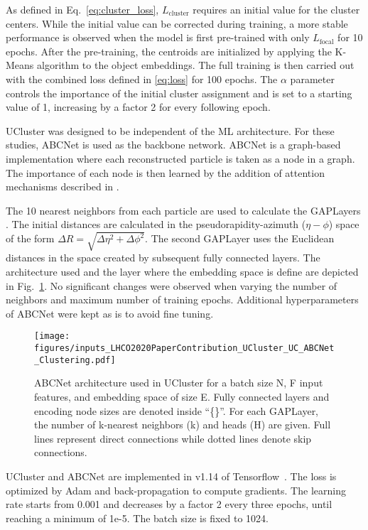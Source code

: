 \documentclass[a4paper,11pt]{article}
\begin{document}
As defined in Eq.~\ref{eq:cluster_loss}, $L_{\mathrm{cluster}}$ requires an initial value for the cluster centers. While the initial value can be corrected during training, a more stable performance is observed when the model is first pre-trained with only $L_{\mathrm{focal}}$ for 10 epochs. After the pre-training, the centroids are initialized by applying the K-Means algorithm \cite{10.2307/2346830} to the object embeddings. The full training is then carried out with the combined loss defined in \ref{eq:loss} for 100 epochs. The $\alpha$ parameter controls the importance of the initial cluster assignment and is set to a starting value of 1,  increasing by a factor 2 for every following epoch. 

UCluster was designed to be independent of the ML architecture. For these studies,  ABCNet \cite{Mikuni:2020wpr} is used as the backbone network. ABCNet is a graph-based implementation where each reconstructed particle is taken as a node in a graph. The importance of each node is then learned by the addition of attention mechanisms described in  \cite{velikovi2017graph}.

The 10 nearest neighbors from each particle are used to calculate the GAPLayers \cite{2019arXiv190508705C}. The initial distances are calculated in the pseudorapidity-azimuth ($\eta-\phi$) space of the form $\Delta R = \sqrt{\Delta\eta^2 + \Delta\phi^2}$. The second GAPLayer uses the Euclidean distances in the space created by subsequent fully connected layers. The architecture used and the layer where the embedding space is define are depicted in Fig.~\ref{fig:abc_model}. No significant changes were observed when varying the number of neighbors and maximum number of training epochs. Additional hyperparameters of ABCNet were kept as is to avoid fine tuning. 

\begin{figure}[h!]
    \centering
    \texttt{[image: figures/inputs\_LHCO2020PaperContribution\_UCluster\_UC\_ABCNet\_Clustering.pdf]}
    \caption{ABCNet architecture used in UCluster for a batch size N, F input features, and embedding space of size E. Fully connected layers and encoding node sizes are denoted inside ``\{\}''. For each GAPLayer, the number of k-nearest neighbors (k) and heads (H) are given. Full lines represent direct connections while dotted lines denote skip connections.}
    \label{fig:abc_model}
\end{figure}

UCluster and ABCNet are implemented in v1.14 of Tensorflow~\cite{tensorflow}. The loss is optimized by Adam \cite{adam} and back-propagation to compute gradients. The learning rate starts from 0.001 and decreases by a factor 2 every three epochs, until reaching a minimum of 1e-5. The batch size is fixed to 1024.
\end{document}
